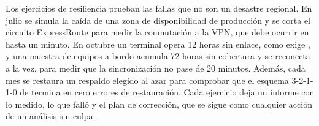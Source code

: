 Los ejercicios de resiliencia prueban las fallas que no son un desastre regional. En julio se simula la
caída de una zona de disponibilidad de producción y se corta el circuito ExpressRoute para medir la conmutación a la
VPN, que debe ocurrir en hasta un minuto. En octubre un terminal opera 12 horas sin enlace, como exige
, y una muestra de equipos a bordo acumula 72 horas sin cobertura y se reconecta a la
vez, para medir que la sincronización no pase de 20 minutos. Además, cada mes se restaura un respaldo
elegido al azar para comprobar que el esquema 3-2-1-1-0 de  termina en cero errores
de restauración. Cada ejercicio deja un informe con lo medido, lo que falló y el plan de corrección, que
se sigue como cualquier acción de un análisis sin culpa.
